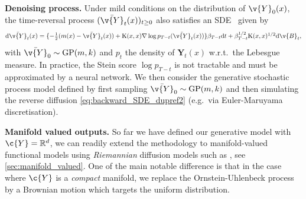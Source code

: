 \textbf{Denoising process.}
Under mild conditions on the distribution of \(\v{Y}_0(x)\), the time-reversal process \((\bar{\v{Y}}_t(x))_{t \geq 0}\) also satisfies an SDE~\parencite{cattiaux2021time,haussmann1986time} given by \begin{equation}\label{eq:backward_SDE_dupref2} \textstyle \mathrm{d} \bar{\v{Y}}_t(x) = \{-\tfrac{1}{2} (m(x) - \bar{\v{Y}}_t(x)) + \mathrm{K}(x,x) \nabla \log p_{T-t}(\bar{\v{Y}}_t(x)) \} \beta_{T-t} \mathrm{d} t + \beta_{T-t}^{1/2} \mathrm{K}(x,x)^{1/2} \mathrm{d} \v{B}_t, \end{equation} with \(\bar{\v{Y}}_0 \sim \mathrm{GP} (m, k)\) and \(p_t\) the density of \(\mathbf{Y}_t(x)\) w.r.t.~the Lebesgue measure.
In practice, the Stein score \(\log p_{T-t}\) is not tractable and must be approximated by a neural network.
We then consider the generative stochastic process model defined by first sampling \(\bar{\v{Y}}_0 \sim \mathrm{GP} (m, k)\) and then simulating the reverse diffusion \eqref{eq:backward_SDE_dupref2} (e.g.\ via Euler-Maruyama discretisation).

\textbf{Manifold valued outputs.}
So far we have defined our generative model with \(\c{Y} = \R^d\), we can readily extend the methodology to manifold-valued functional models using \emph{Riemannian} diffusion models such as \cite{de2022riemannian,huang2022riemannian}, see \cref{sec:manifold_valued}.
One of the main notable difference is that in the case where \(\c{Y}\) is a \emph{compact} manifold, we replace the Ornstein-Uhlenbeck process by a Brownian motion which targets the uniform distribution.

